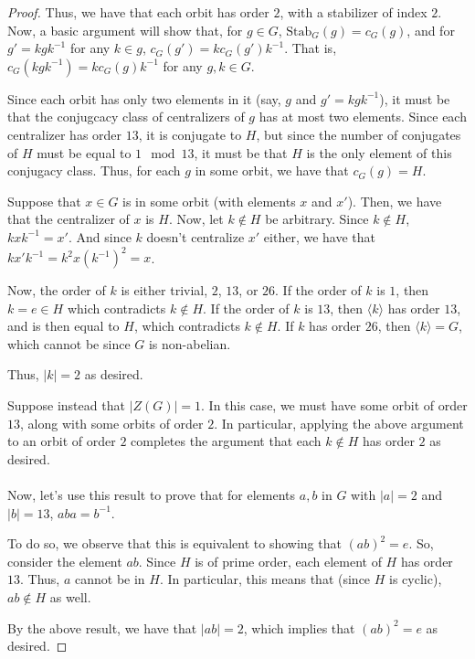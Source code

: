 \documentclass[12pt,reqno]{amsart}
\newcommand{\inv}{^{-1}}
\begin{document}
\begin{proof}
    Thus, we have that each orbit has order $2$, with a stabilizer of index
    $2$. Now, a basic argument will show that, for $g\in G$, $\textrm{Stab}_G(g)
    = c_G(g)$, and for $g' = kgk\inv$ for any $k\in g$, $c_G(g') =
    kc_G(g')k\inv$.
    That is, $c_G(kgk\inv) = kc_G(g)k\inv$ for any $g,k\in G$.

    Since each orbit has only two elements in it (say, $g$ and $g'=kgk\inv$),
    it must be that the conjugcacy class of centralizers of $g$ has at most
    two elements. Since each centralizer has order $13$, it is conjugate to
    $H$, but since the number of conjugates of $H$ must be equal to $1\mod 13$,
    it must be that $H$ is the only element of this conjugacy class. Thus,
    for each $g$ in some orbit, we have that $c_G(g) = H$.

    Suppose that $x\in G$ is in some orbit (with elements $x$ and $x'$).
    Then, we have that the centralizer of $x$ is $H$. Now, let $k\not\in H$ be
    arbitrary. Since $k\not\in H$, $kxk\inv =x'$. And since $k$ doesn't
    centralize $x'$ either, we have that $kx'k\inv = k^2x(k\inv)^2 = x$.
    
    Now, the order of $k$ is either trivial, $2$, $13$, or $26$. If the order
    of $k$ is $1$, then $k=e\in H$ which contradicts $k\not\in H$. If the order
    of $k$ is $13$, then $\langle k \rangle$ has order $13$, and is then equal
    to $H$, which contradicts $k\not\in H$. If $k$ has order $26$, then $\langle
    k\rangle = G$, which cannot be since $G$ is non-abelian.
    
    Thus, $|k| = 2$ as desired.

    Suppose instead that $|Z(G)| = 1$. In this case, we must have some
    orbit of order $13$, along with some orbits of order $2$. In particular,
    applying the above argument to an orbit of order $2$ completes the argument
    that each $k\not\in H$ has order $2$ as desired.
    \\
    \\
    Now, let's use this result to prove that for elements $a,b$ in $G$ with
    $|a|=2$ and $|b|=13$, $aba=b\inv$.

    To do so, we observe that this is equivalent to showing that $(ab)^2 = e$.
    So, consider the element $ab$. Since $H$ is of prime order, each element of
    $H$ has order $13$. Thus, $a$ cannot be in $H$. In particular, this means
    that (since $H$ is cyclic), $ab\not\in H$ as well.

    By the above result, we have that $|ab| = 2$, which implies that
    $(ab)^2 = e$ as desired.
\end{proof}
\end{document}
